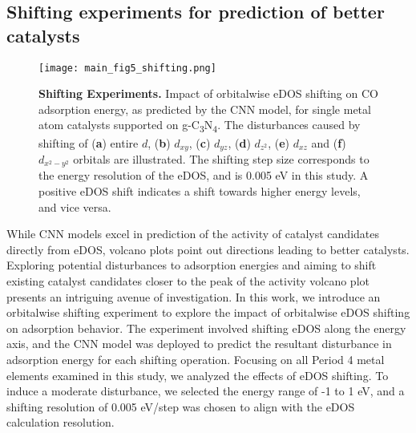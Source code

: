 
\subsection{Shifting experiments for prediction of better catalysts}

\begin{figure}[htbp]
    \centering
    \texttt{[image: main\_fig5\_shifting.png]}
    \caption{\textbf{Shifting Experiments.}
    Impact of orbitalwise eDOS shifting on CO adsorption energy, as predicted by the CNN model,
    for single metal atom catalysts supported on g-C\textsubscript{3}N\textsubscript{4}.
    The disturbances caused by shifting of (\textbf{a}) entire $d$, (\textbf{b}) $d_{xy}$,
    (\textbf{c}) $d_{yz}$, (\textbf{d}) $d_{z^2}$, (\textbf{e}) $d_{xz}$ and
    (\textbf{f}) $d_{x^2-y^2}$ orbitals are illustrated.
    The shifting step size corresponds to the energy resolution of the eDOS,
    and is 0.005 eV in this study.
    A positive eDOS shift indicates a shift towards higher energy levels, and vice versa.}
    \label{main_fig5:shifting}
\end{figure}

While CNN models excel in prediction of the activity of catalyst candidates directly from eDOS,
volcano plots point out directions leading to better catalysts.
Exploring potential disturbances to adsorption energies and aiming to shift existing catalyst
candidates closer to the peak of the activity volcano plot presents an intriguing avenue of investigation.
In this work, we introduce an orbitalwise shifting experiment to explore
the impact of orbitalwise eDOS shifting on adsorption behavior.
The experiment involved shifting eDOS along the energy axis,
and the CNN model was deployed to predict the resultant disturbance in adsorption energy for each shifting operation.
Focusing on all Period 4 metal elements examined in this study, we analyzed the effects of eDOS shifting.
To induce a moderate disturbance, we selected the energy range of -1 to 1 eV,
and a shifting resolution of 0.005 eV/step was chosen to align with the eDOS calculation resolution.

